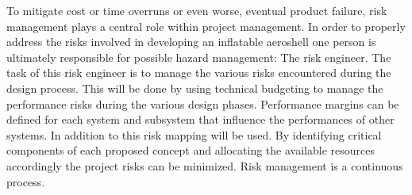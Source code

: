 To mitigate cost or time overruns or even worse, eventual product failure, risk management plays a central role within project management. In order to properly address the risks involved in developing an inflatable aeroshell one person is ultimately responsible for possible hazard management: The risk engineer. The task of this risk engineer is to manage the various risks encountered during the design process. This will be done by using technical budgeting to manage the performance risks during the various design phases. Performance margins can be defined for each system and subsystem that influence the performances of other systems. In addition to this risk mapping will be used. By identifying critical components of each proposed concept and allocating the available resources accordingly the project risks can be minimized. Risk management is a continuous process.